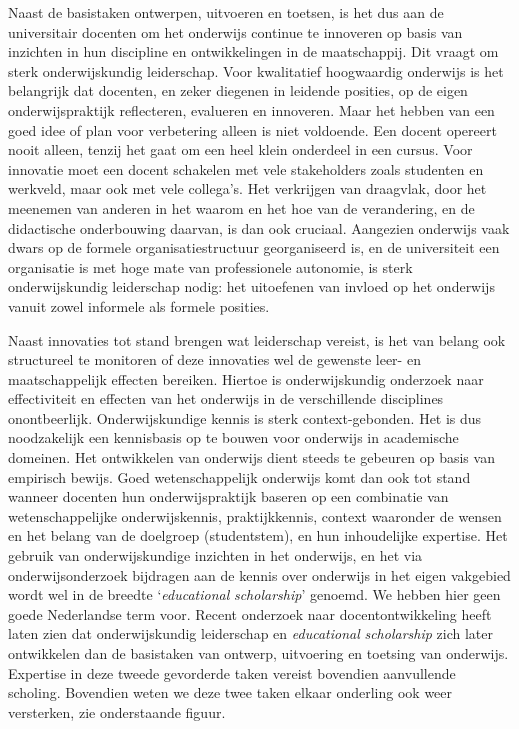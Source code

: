 \documentclass[smallauthor, chapterhaspagenum, nochapterinheader, pagenuminheader,  bigchapnum,medium2, tocpages,  garamond, titleinheader]{jote-book}
\begin{document}
	Naast de basistaken ontwerpen, uitvoeren en toetsen, is het dus aan de universitair docenten om het onderwijs continue te innoveren op basis van inzichten in hun discipline en ontwikkelingen in de maatschappij. Dit vraagt om sterk onderwijskundig leiderschap. Voor kwalitatief hoogwaardig onderwijs is het belangrijk dat docenten, en zeker diegenen in leidende posities, op de eigen onderwijspraktijk reflecteren, evalueren en innoveren. Maar het hebben van een goed idee of plan voor verbetering alleen is niet voldoende. Een docent opereert nooit alleen, tenzij het gaat om een heel klein onderdeel in een cursus. Voor innovatie moet een docent schakelen met vele stakeholders zoals studenten en werkveld, maar ook met vele collega's. Het verkrijgen van draagvlak, door het meenemen van anderen in het waarom en het hoe van de verandering, en de didactische onderbouwing daarvan, is dan ook cruciaal. Aangezien onderwijs vaak dwars op de formele organisatiestructuur georganiseerd is, en de universiteit een organisatie is met hoge mate van professionele autonomie, is sterk onderwijskundig leiderschap nodig: het uitoefenen van invloed op het onderwijs vanuit zowel informele als formele posities.



	Naast innovaties tot stand brengen wat leiderschap vereist, is het van belang ook structureel te monitoren of deze innovaties wel de gewenste leer- en maatschappelijk effecten bereiken. Hiertoe is onderwijskundig onderzoek naar effectiviteit en effecten van het onderwijs in de verschillende disciplines onontbeerlijk. Onderwijskundige kennis is sterk context-gebonden. Het is dus noodzakelijk een kennisbasis op te bouwen voor onderwijs in academische domeinen. Het ontwikkelen van onderwijs dient steeds te gebeuren op basis van empirisch bewijs. Goed wetenschappelijk onderwijs komt dan ook tot stand wanneer docenten hun onderwijspraktijk baseren op een combinatie van wetenschappelijke onderwijskennis, praktijkkennis, context waaronder de wensen en het belang van de doelgroep (studentstem), en hun inhoudelijke expertise. Het gebruik van onderwijskundige inzichten in het onderwijs, en het via onderwijsonderzoek bijdragen aan de kennis over onderwijs in het eigen vakgebied wordt wel in de breedte ‘\emph{educational}\emph{ }\emph{scholarship}' genoemd. We hebben hier geen goede Nederlandse term voor. Recent onderzoek naar docentontwikkeling heeft laten zien dat onderwijskundig leiderschap en \emph{educational}\emph{ }\emph{scholarship} zich later ontwikkelen dan de basistaken van ontwerp, uitvoering en toetsing van onderwijs. Expertise in deze tweede gevorderde taken vereist bovendien aanvullende scholing. Bovendien weten we deze twee taken elkaar onderling ook weer versterken, zie onderstaande figuur.
\end{document}
